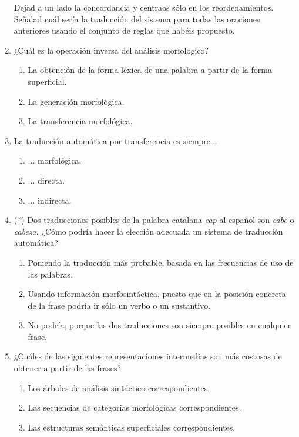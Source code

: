 \begin{enumerate}
Dejad a un lado la concordancia y centraos sólo en los reordenamientos. Señalad cuál sería la traducción del sistema para todas las oraciones anteriores usando el conjunto de reglas que habéis propuesto. 

\item ¿Cuál es la operación inversa del análisis morfológico? \begin{enumerate} \item La obtención de la forma léxica de una palabra a partir de la forma superficial. \item La generación morfológica. \item La transferencia morfológica. \end{enumerate} 

\item La traducción automática por transferencia es siempre... \begin{enumerate} \item ... morfológica. \item ... directa. \item ... indirecta. \end{enumerate} 

\item (*) Dos traducciones posibles de la palabra catalana \emph{cap} al español son \emph{cabe} o \emph{cabeza}. ¿Cómo podría hacer la elección adecuada un sistema de traducción automática? \begin{enumerate} \item Poniendo la traducción más probable, basada en las frecuencias de uso de las palabras. \item Usando información morfosintáctica, puesto que en la posición concreta de la frase podría ir sólo un verbo o un sustantivo. \item No podría, porque las dos traducciones son siempre posibles en cualquier frase. \end{enumerate} 

\item ¿Cuáles de las siguientes representaciones intermedias son más costosas de obtener a partir de las frases? \begin{enumerate} \item Los árboles de análisis sintáctico correspondientes. \item Las secuencias de categorías morfológicas correspondientes. \item Las estructuras semánticas superficiales correspondientes. \end{enumerate} 


\end{enumerate}
